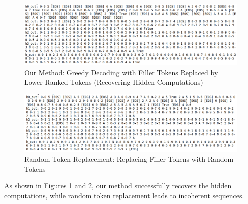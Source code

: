 \documentclass{article}
\begin{document}
\begin{figure}[H]
    \centering
    \includegraphics[width=\textwidth]{our_method_decoding.png}
    \caption{Our Method: Greedy Decoding with Filler Tokens Replaced by Lower-Ranked Tokens (Recovering Hidden Computations)}
    \label{fig:our-method}
\end{figure}

\begin{figure}[H]
    \centering
    \includegraphics[width=\textwidth]{random_tokens_decoding.png}
    \caption{Random Token Replacement: Replacing Filler Tokens with Random Tokens}
    \label{fig:random}
\end{figure}

As shown in Figures \ref{fig:our-method} and \ref{fig:random}, our method successfully recovers the hidden computations, while random token replacement leads to incoherent sequences.
\end{document}
